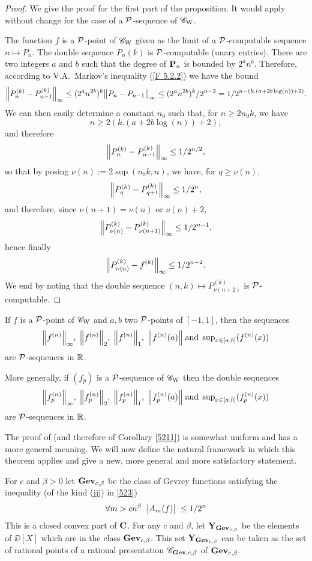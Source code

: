 \begin{proof} We give the proof for the first part of the proposition. It would apply without change for the case of a ${\cal P}$-sequence of ${{{\mathscr C}}_{\rm W}}$. 

\noindent 
The function $f$ is a ${\cal P}$-point of ${{{\mathscr C}}_{\rm W}}$ given as the limit of a  ${\cal P}$-computable sequence $n \mapsto  P_n$. 
The double sequence $P_n(k)$ is ${\cal P}$-computable (unary entries). There are two integers $a$ and $b$ such that the degree of ${\bf P}_n$ is bounded by $2^a n^b$. Therefore, according to V.A.\ Markov's inequality (\ref{F 5.2.2}) we have the bound
\[
\Big\lVert  P_n^{(k)} - P_{n-1}^{(k)}  \Big\rVert_\infty \leq (2^an^{2b})^k \big\lVert  P_n - P_{n-1}  \big\rVert_{\infty} \leq (2^an^{2b})^k /2^{n-2} = 1/2^{n-(k.(a+2b \log(n))+2)}.
\]
We can then easily determine a constant $n_0$ such that, for $n \geq 2n_0k$, we have 
\[
n \geq 2(k.(a+2b \log(n))+2),
\] 
and therefore 
\[
\Big\lVert  P_n^{(k)} - P_{n-1}^{(k)}  \Big\rVert_\infty \leq 1/2^{n/2},
\] 
so that by posing $\nu(n) := 2 \sup(n_0k,n)$, we have, for $q \geq \nu(n),$ 
\[
\Big\lVert  P_q^{(k)} - P_{q+1}^{(k)}  \Big\rVert_\infty \leq 1/2^n,
\]
and therefore, since $\nu(n+1) = \nu(n)$ or $\nu(n)+2,$ 
\[
\Big\lVert  P_{\nu(n)}^{(k)} - P_{\nu(n+1)}^{(k)}  \Big\rVert_\infty \leq 1/2^{n-1},
\]
 hence finally 
\[
\Big\lVert  P_{\nu(n)}^{(k)} - f^{(k)}  \Big\rVert_\infty \leq 1/2^{n-2}.
\]
We end by noting that the double sequence $(n,k) \mapsto P_{\nu(n+2)}^{(k)}$ is ${\cal P}$-computable. 
\end{proof}


\begin{corollary} \label{5211}
If $f$ is a ${\cal P}$-point of ${{{\mathscr C}}_{\rm W}}$ and $a, b$ two ${\cal P}$-points of $[-1,1]$, then the sequences 
\[
\Big\lVert f^{(n)}  \Big\rVert_{\infty}, \; \Big\lVert f^{(n)}  \Big\rVert_2, \; \Big\lVert f^{(n)}  \Big\rVert_1, \; \Big\lVert f^{(n)}(a) \Big\rVert \;{\rm and} \; \sup\nolimits_{x \in [a,b]} (f^{(n)}(x))
\]
are ${\cal P}$-sequences in $\mathbb {R}$.

\noindent
More generally, if $(f_p)$ is a ${\cal P}$-sequence of ${{{\mathscr C}}_{\rm W}}$ then the double sequences 
\[
\Big\lVert f_p^{(n)} \Big\rVert_\infty, \; \Big\lVert f_p^{(n)}  \Big\rVert_2, \; \Big\lVert f_p^{(n)}  \Big\rVert_1, \; \Big\lVert f_p^{(n)}(a) \Big\rVert \; {\rm and} \; \sup\nolimits_{x \in [a,b]} (f_p^{(n)}(x))
\]
are ${\cal P}$-sequences in $\mathbb {R}$.
\end{corollary}

The proof of  (and therefore of Corollary \ref{5211}) is somewhat uniform and has a more general meaning. We will now define the natural framework in which this theorem applies and give a new, more general and more satisfactory statement.

\begin{definition}\label{5212}
For $c$ and $\beta > 0$ let ${\bf Gev}_{c,\beta}$ be the class of Gevrey functions satisfying the inequality (of the kind (jjj) in \ref{523})
\[
 \forall m > cn^{\beta} \; \; \big|{A_m(f)}\big|\; \leq 1/2^n
\] 
This is a closed convex part of ${\bf C}$. For any $c$ and $\beta$, 
let ${\bf Y}_{{\bf Gev}_{c, \beta}}$ be the elements of $\DD[X]$ which are in the class ${\bf Gev}_{c, \beta}$. 
This set ${\bf Y}_{{\bf Gev}_{c, \beta}}$ can be taken as the set of rational points of a rational presentation ${{\mathscr C}}_{{\bf Gev},c,\beta}$ of ${\bf Gev}_{c,\beta}$.
\end{definition}

